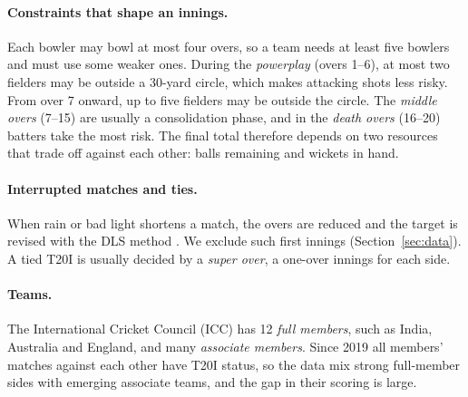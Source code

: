 \documentclass{article}
\newcommand{\1}{\mathbf{1}}
\begin{document}
\paragraph{Constraints that shape an innings.} Each bowler may bowl at most four overs, so a team needs at least five bowlers and must use some weaker ones. During the \emph{powerplay} (overs 1--6), at most two fielders may be outside a 30-yard circle, which makes attacking shots less risky. From over 7 onward, up to five fielders may be outside the circle. The \emph{middle overs} (7--15) are usually a consolidation phase, and in the \emph{death overs} (16--20) batters take the most risk. The final total therefore depends on two resources that trade off against each other: balls remaining and wickets in hand.

\paragraph{Interrupted matches and ties.} When rain or bad light shortens a match, the overs are reduced and the target is revised with the DLS method \citep{duckworth1998,stern2016}. We exclude such first innings (Section~\ref{sec:data}). A tied T20I is usually decided by a \emph{super over}, a one-over innings for each side.

\paragraph{Teams.} The International Cricket Council (ICC) has 12 \emph{full members}, such as India, Australia and England, and many \emph{associate members}. Since 2019 all members' matches against each other have T20I status, so the data mix strong full-member sides with emerging associate teams, and the gap in their scoring is large.
\end{document}
